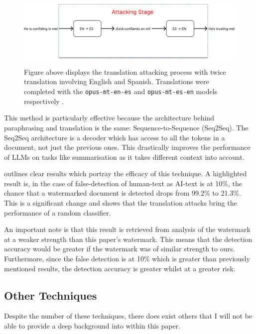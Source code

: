 \documentclass{l4proj}
\theoremstyle{definition}
\begin{document}
        \begin{figure}[h]
            \centering
            \includegraphics[height=3.5cm, width=1\linewidth, keepaspectratio]{images/background/translation-removal-process.pdf}
            \caption{Figure above displays the translation attacking process with twice translation involving English and Spanish. Translations were completed with the \texttt{opus-mt-en-es} and \texttt{opus-mt-es-en} models respectively \citep{TiedemannThottingal:EAMT2020}.}
            \label{fig:translation-removal-process}
        \end{figure}
        
        This method is particularly effective because the architecture behind paraphrasing and translation is the same: Sequence-to-Sequence (Seq2Seq). The Seq2Seq architecture is a decoder which has access to all the tokens in a document, not just the previous ones. This drastically improves the performance of LLMs on tasks like summarisation as it takes different context into account. 

        \citet{he2024watermarks} outlines clear results which portray the efficacy of this technique. A highlighted result is, in the case of false-detection of human-text as AI-text is at 10\%, the chance that a watermarked document is detected drops from 99.2\% to 21.3\%. This is a significant change and shows that the translation attacks bring the performance of a random classifier. 

        An important note is that this result is retrieved from analysis of the watermark at a weaker strength than this paper's watermark. This means that the detection accuracy would be greater if the watermark was of similar strength to ours. Furthermore, since the false detection is at 10\% which is greater than previously mentioned results, the detection accuracy is greater whilst at a greater risk.

    \subsection{Other Techniques}
        Despite the number of these techniques, there does exist others that I will not be able to provide a deep background into within this paper.
\end{document}

